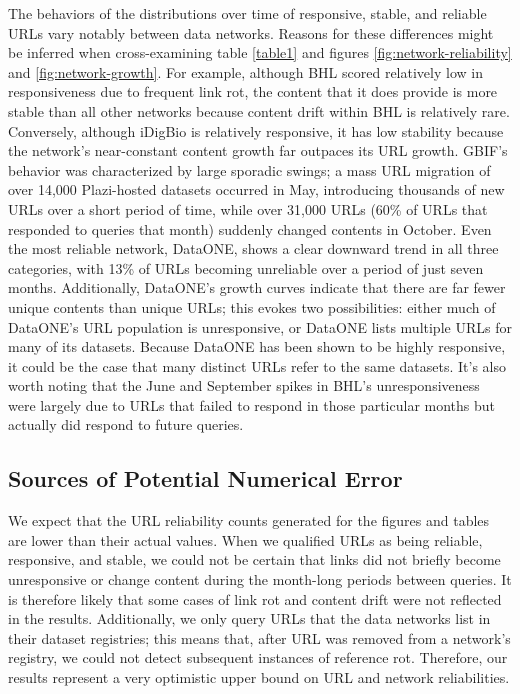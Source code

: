 The behaviors of the distributions over time of responsive, stable, and reliable URLs vary notably between data networks. Reasons for these differences might be inferred when cross-examining table \ref{table1} and figures \ref{fig:network-reliability} and \ref{fig:network-growth}. For example, although BHL scored relatively low in responsiveness due to frequent link rot, the content that it does provide is more stable than all other networks because content drift within BHL is relatively rare. Conversely, although iDigBio is relatively responsive, it has low stability because the network's near-constant content growth far outpaces its URL growth. GBIF's behavior was characterized by large sporadic swings; a mass URL migration of over 14,000 Plazi-hosted datasets occurred in May, introducing thousands of new URLs over a short period of time, while over 31,000 URLs (60\% of URLs that responded to queries that month) suddenly changed contents in October. Even the most reliable network, DataONE, shows a clear downward trend in all three categories, with 13\% of URLs becoming unreliable over a period of just seven months. Additionally, DataONE's growth curves indicate that there are far fewer unique contents than unique URLs; this evokes two possibilities: either much of DataONE's URL population is unresponsive, or DataONE lists multiple URLs for many of its datasets. Because DataONE has been shown to be highly responsive, it could be the case that many distinct URLs refer to the same datasets. It's also worth noting that the June and September spikes in BHL's unresponsiveness were largely due to URLs that failed to respond in those particular months but actually did respond to future queries.

\subsection*{Sources of Potential Numerical Error}
We expect that the URL reliability counts generated for the figures and tables are lower than their actual values. When we qualified URLs as being reliable, responsive, and stable, we could not be certain that links did not briefly become unresponsive or change content during the month-long periods between queries. It is therefore likely that some cases of link rot and content drift were not reflected in the results. Additionally, we only query URLs that the data networks list in their dataset registries; this means that, after URL was removed from a network's registry, we could not detect subsequent instances of reference rot. Therefore, our results represent a very optimistic upper bound on URL and network reliabilities.


